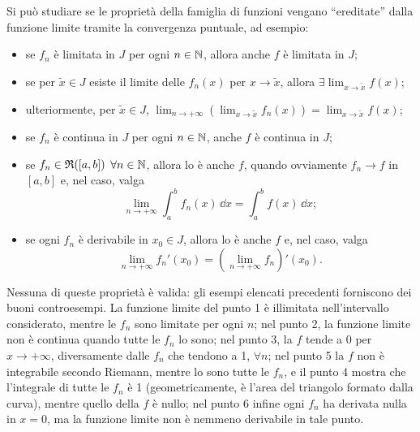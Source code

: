 Si può studiare se le proprietà della famiglia di funzioni vengano ``ereditate'' dalla funzione limite tramite la convergenza puntuale, ad esempio:
\begin{itemize}
\item se $f_n$ è limitata in $J$ per ogni $n\in\mathbb{N}$, allora anche $f$ è limitata in $J$;
\item se per $\tilde{x}\in J$ esiste il limite delle $f_n(x)$ per $x\to\tilde{x}$, allora $\exists\lim_{x\to\tilde{x}}f(x)$;
\item ulteriormente, per $\tilde{x}\in J$, $\lim_{n\to+\infty}\left(\lim_{x\to\tilde{x}}f_n(x)\right)=\lim_{x\to\tilde{x}}f(x)$;
\item se $f_n$ è continua in $J$ per ogni $n\in\mathbb{N}$, anche $f$ è continua in $J$;
\item se $f_n\in\mathfrak{R}([a,b])$ $\forall n\in\mathbb{N}$, allora lo è anche $f$, quando ovviamente $f_n\to f$ in $[a,b]$ e, nel caso, valga
\[
\lim_{n\to+\infty}\int_a^bf_n(x)\,\dd x=\int_a^bf(x)\,\dd x;
\]
\item se ogni $f_n$ è derivabile in $x_0\in J$, allora lo è anche $f$ e, nel caso, valga
\[
\lim_{n\to+\infty}f_n'(x_0)=\left(\lim_{n\to+\infty}f_n\right)'(x_0).
\]
\end{itemize}
Nessuna di queste proprietà è valida: gli esempi elencati precedenti forniscono dei buoni controesempi. La funzione limite del punto 1 è illimitata nell'intervallo considerato, mentre le $f_n$ sono limitate per ogni $n$; nel punto 2, la funzione limite non è continua quando tutte le $f_n$ lo sono; nel punto 3, la $f$ tende a 0 per $x\to+\infty$, diversamente dalle $f_n$ che tendono a 1, $\forall n$; nel punto 5 la $f$ non è integrabile secondo Riemann, mentre lo sono tutte le $f_n$, e il punto 4 mostra che l'integrale di tutte le $f_n$ è 1 (geometricamente, è l'area del triangolo formato dalla curva), mentre quello della $f$ è nullo; nel punto 6 infine ogni $f_n$ ha derivata nulla in $x=0$, ma la funzione limite non è nemmeno derivabile in tale punto.

